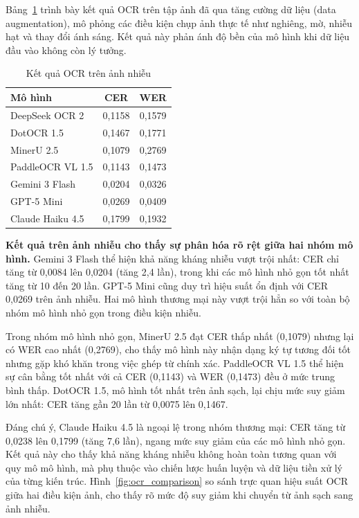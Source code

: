 Bảng~\ref{tab:ocr_augmented} trình bày kết quả OCR trên tập ảnh đã qua tăng cường dữ liệu (data augmentation), mô phỏng các điều kiện chụp ảnh thực tế như nghiêng, mờ, nhiễu hạt và thay đổi ánh sáng. Kết quả này phản ánh độ bền của mô hình khi dữ liệu đầu vào không còn lý tưởng.

\begin{table}[htbp]
\centering
\caption{Kết quả OCR trên ảnh nhiễu}
\label{tab:ocr_augmented}
\begin{tabular}{lcc}
\toprule
\textbf{Mô hình} & \textbf{CER} & \textbf{WER} \\
\midrule
DeepSeek OCR 2 & 0,1158 & 0,1579 \\
DotOCR 1.5 & 0,1467 & 0,1771 \\
MinerU 2.5 & 0,1079 & 0,2769 \\
PaddleOCR VL 1.5 & 0,1143 & 0,1473 \\
\midrule
Gemini 3 Flash & 0,0204 & 0,0326 \\
GPT-5 Mini & 0,0269 & 0,0409 \\
Claude Haiku 4.5 & 0,1799 & 0,1932 \\
\bottomrule
\end{tabular}
\end{table}

\textbf{Kết quả trên ảnh nhiễu cho thấy sự phân hóa rõ rệt giữa hai nhóm mô hình.} Gemini 3 Flash thể hiện khả năng kháng nhiễu vượt trội nhất: CER chỉ tăng từ 0,0084 lên 0,0204 (tăng 2,4 lần), trong khi các mô hình nhỏ gọn tốt nhất tăng từ 10 đến 20 lần. GPT-5 Mini cũng duy trì hiệu suất ổn định với CER 0,0269 trên ảnh nhiễu. Hai mô hình thương mại này vượt trội hẳn so với toàn bộ nhóm mô hình nhỏ gọn trong điều kiện nhiễu.

Trong nhóm mô hình nhỏ gọn, MinerU 2.5 đạt CER thấp nhất (0,1079) nhưng lại có WER cao nhất (0,2769), cho thấy mô hình này nhận dạng ký tự tương đối tốt nhưng gặp khó khăn trong việc ghép từ chính xác. PaddleOCR VL 1.5 thể hiện sự cân bằng tốt nhất với cả CER (0,1143) và WER (0,1473) đều ở mức trung bình thấp. DotOCR 1.5, mô hình tốt nhất trên ảnh sạch, lại chịu mức suy giảm lớn nhất: CER tăng gần 20 lần từ 0,0075 lên 0,1467.

Đáng chú ý, Claude Haiku 4.5 là ngoại lệ trong nhóm thương mại: CER tăng từ 0,0238 lên 0,1799 (tăng 7,6 lần), ngang mức suy giảm của các mô hình nhỏ gọn. Kết quả này cho thấy khả năng kháng nhiễu không hoàn toàn tương quan với quy mô mô hình, mà phụ thuộc vào chiến lược huấn luyện và dữ liệu tiền xử lý của từng kiến trúc. Hình~\ref{fig:ocr_comparison} so sánh trực quan hiệu suất OCR giữa hai điều kiện ảnh, cho thấy rõ mức độ suy giảm khi chuyển từ ảnh sạch sang ảnh nhiễu.

